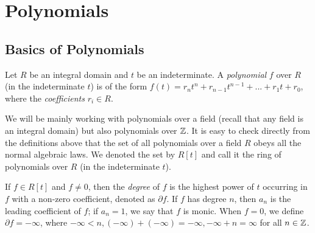 \newpage

\section{Polynomials}
\subsection{Basics of Polynomials}

\begin{definition}
    Let $R$ be an integral domain and $t$ be an indeterminate. A \textit{polynomial} $f$ over $R$ (in the indeterminate $t$) is of the form $f(t) = r_n t^n + r_{n-1} t^{n-1} + ... + r_1 t + r_0$, where the \textit{coefficients} $r_i \in R$. 
\end{definition}

We will be mainly working with polynomials over a field (recall that any field is an integral domain) but also polynomials over $\mathbb Z$. It is easy to check directly from the definitions above that the set of all polynomials over a field $R$ obeys all the normal algebraic laws. We denoted the set by $R[t]$ and call it the ring of polynomials over $R$ (in the indeterminate $t$).


\begin{definition}
	If $f \in R[t]$ and $f \neq 0$, then the \textit{degree} of $f$ is the highest power of $t$ occurring in $f$ with a non-zero coefficient, denoted as $\partial f$. If $f$ has degree $n$, then $a_n$ is the leading coefficient of $f$; if $a_n = 1$, we say that $f$ is monic. When $f = 0$, we define $\partial f = - \infty$, where $-\infty < n, (-\infty) + (- \infty) = -\infty, -\infty + n = \infty$ for all $n \in \mathbb Z$. 
\end{definition}




